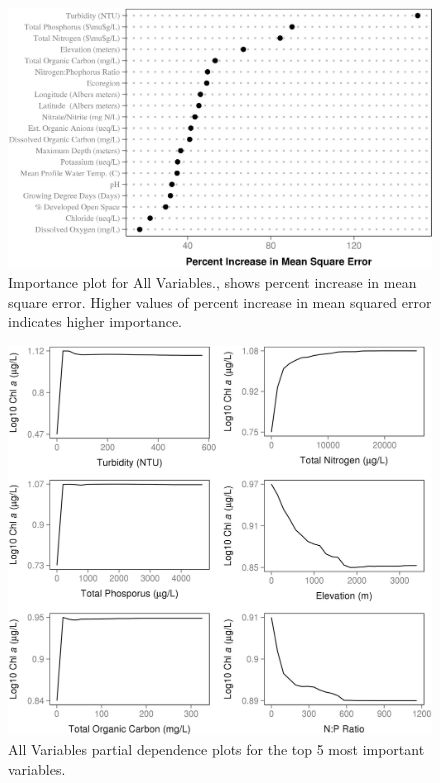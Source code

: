 \documentclass[12pt,]{article}
\begin{document}
\newpage

\begin{figure}[htbp]
\centering
\includegraphics{manuscript_files/figure-latex/All_Importance-1.jpeg}
\caption{Importance plot for All Variables., shows percent increase in
mean square error. Higher values of percent increase in mean squared
error indicates higher importance. \label{fig:All_Importance}}
\end{figure}

\newpage

\begin{figure}[htbp]
\centering
\includegraphics{manuscript_files/figure-latex/all_partial_dependence-1.jpeg}
\caption{All Variables partial dependence plots for the top 5 most
important variables. \label{fig:all_partial_dependence}}
\end{figure}
\end{document}
